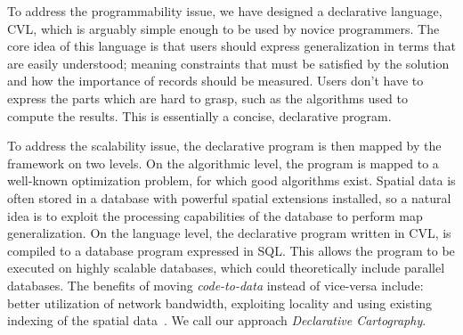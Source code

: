 To address the programmability issue, we have designed a declarative language, CVL, which is arguably simple enough to be used by novice programmers. The core idea of this language is that users should express generalization in terms that are easily understood; meaning constraints that must be satisfied by the solution and how the importance of records should be measured. Users don't have to express the parts which are hard to grasp, such as the algorithms used to compute the results. This is essentially a concise, declarative program.

To address the scalability issue, the declarative program is then mapped by the framework on two levels. On the algorithmic level, the program is mapped to a well-known optimization problem, for which good algorithms exist. Spatial data is often stored in a database with powerful spatial extensions installed, so a natural idea is to exploit the processing capabilities of the database to perform map generalization. On the language level, the declarative program written in CVL, is compiled to a database program expressed in SQL. This allows the program to be executed on highly scalable databases, which could theoretically include parallel databases. The benefits of moving \emph{code-to-data} instead of vice-versa include: better utilization of network bandwidth, exploiting locality and using existing indexing of the spatial data~\cite{Guttman1984:RTree,Hellerstein1995:GiST}. We call our approach \emph{Declarative Cartography}.

\vspace{5em}

